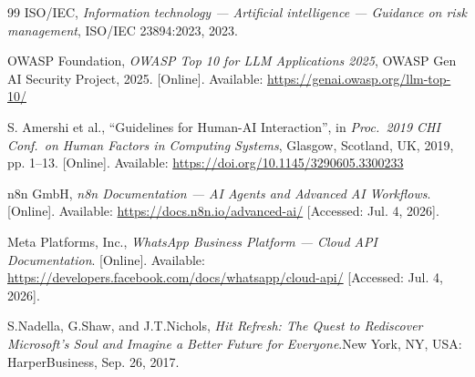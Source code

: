 \begin{thebibliography}{99}
ISO/IEC, \textit{Information technology --- Artificial intelligence --- Guidance on risk management}, ISO/IEC 23894:2023, 2023.

OWASP Foundation, \textit{OWASP Top 10 for LLM Applications 2025}, OWASP Gen AI Security Project, 2025. [Online]. Available: \url{https://genai.owasp.org/llm-top-10/}

S. Amershi et al., ``Guidelines for Human-AI Interaction'', in \textit{Proc.\ 2019 CHI Conf.\ on Human Factors in Computing Systems}, Glasgow, Scotland, UK, 2019, pp. 1--13. [Online]. Available: \url{https://doi.org/10.1145/3290605.3300233}

n8n GmbH, \textit{n8n Documentation --- AI Agents and Advanced AI Workflows}. [Online]. Available: \url{https://docs.n8n.io/advanced-ai/} [Accessed: Jul. 4, 2026].

Meta Platforms, Inc., \textit{WhatsApp Business Platform --- Cloud API Documentation}. [Online]. Available: \url{https://developers.facebook.com/docs/whatsapp/cloud-api/} [Accessed: Jul. 4, 2026].

S.\@ Nadella, G.\@ Shaw, and J.\@ T.\@ Nichols, \textit{Hit Refresh: The Quest to Rediscover Microsoft's Soul and Imagine a Better Future for Everyone}.\@ New York, NY, USA: HarperBusiness, Sep. 26, 2017. %

\end{thebibliography}

